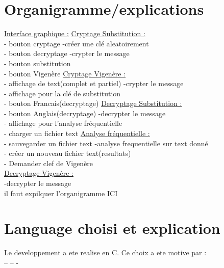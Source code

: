 \documentclass[a4]{article}
\begin{document}
	\section{Organigramme/explications}
			\underline{Interface graphique :}     \hspace{5cm}  \underline{Cryptage Substitution :}\\
			- bouton cryptage            \hspace{5.5cm}       -créer une clé aleatoirement\\
			- bouton decryptage         \hspace{5cm}        -crypter le message\\
			- bouton substitution\\
			- bouton Vigenère           \hspace{5.2cm}       \underline{Cryptage Vigenère :}\\
			- affichage de text(complet et partiel)  \hspace{2.2cm} -crypter le message\\
			- affichage pour la clé de substitution\\
			- bouton Francais(decryptage)   \hspace{3.5cm}     \underline{Decryptage Substitution :}\\
			- bouton Anglais(decryptage)    \hspace{3.5cm}     -decrypter le message\\
			- affichage pour l'analyse fréquentielle\\
			- charger un fichier text       \hspace{4.2cm}  \underline{Analyse fréquentielle :}\\
			- sauvegarder un fichier text     \hspace{3.8cm}  -analyse frequentielle sur text donné\\
			- créer un nouveau fichier text(resultats)\\
			- Demander clef de Vigenère\\
			
			
			\underline{Decryptage Vigenère :}\\
			-decrypter le message\\
			

			
			il faut expilquer l'organigramme ICI
	\section{Language choisi et explication}
	Le developpement a ete realise en C. Ce choix a ete motive par  : \\
–
– 
-
\end{document}
